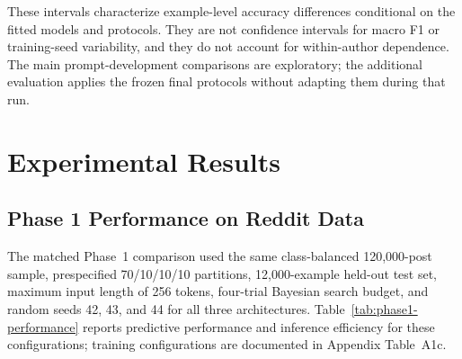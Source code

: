 \documentclass{ieeeaccess}
\begin{document}
These intervals characterize example-level accuracy differences conditional on the fitted models and protocols. They are not confidence intervals for macro F1 or training-seed variability, and they do not account for within-author dependence. The main prompt-development comparisons are exploratory; the additional evaluation applies the frozen final protocols without adapting them during that run.

\section{Experimental Results}
\subsection{Phase 1 Performance on Reddit Data}

The matched Phase~1 comparison used the same class-balanced 120,000-post sample, prespecified 70/10/10/10 partitions, 12,000-example held-out test set, maximum input length of 256 tokens, four-trial Bayesian search budget, and random seeds 42, 43, and 44 for all three architectures. Table~\ref{tab:phase1-performance} reports predictive performance and inference efficiency for these configurations; training configurations are documented in Appendix Table~A1c.
\end{document}
